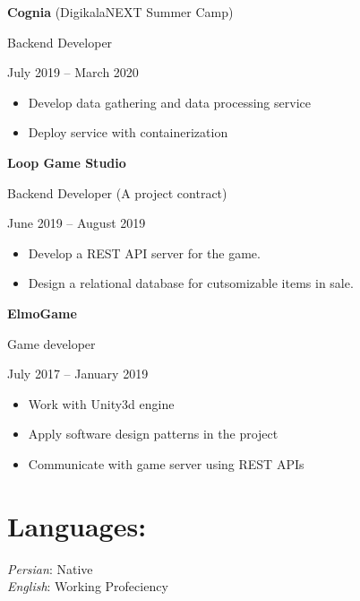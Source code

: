 \documentclass[11pt]{article}
\begin{document}
\noindent \textbf{Cognia} (DigikalaNEXT Summer Camp) \par
Backend Developer \par
July 2019 – March 2020 \par
\begin{itemize}
    \item Develop data gathering and data processing service
    \item Deploy service with containerization
\end{itemize}
\vspace{15pt}

\noindent \textbf{Loop Game Studio} \par
Backend Developer (A project contract) \par
June 2019 – August 2019 \par
\begin{itemize}
    \item Develop a REST API server for the game.
    \item Design a relational database for cutsomizable items in sale.
\end{itemize}
\vspace{15pt}

\noindent \textbf{ElmoGame} \par
Game developer \par
July 2017 – January 2019 \par
\begin{itemize}
    \item Work with Unity3d engine
    \item Apply software design patterns in the project
    \item Communicate with game server using REST APIs
\end{itemize}
\vspace{15pt}


\section{Languages:}
    \emph{Persian}: Native \\
    \emph{English}: Working Profeciency
\end{document}
